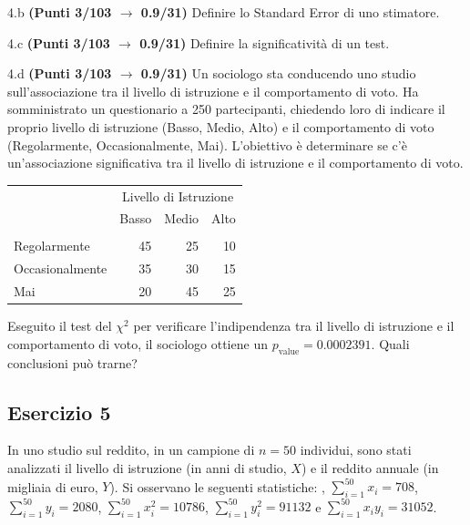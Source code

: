\documentclass[
  11pt,
]{book}
\theoremstyle{mytheoremstyle}
\theoremstyle{mydefstyle}
\begin{document}
4.b \textbf{(Punti 3/103 \(\rightarrow\) 0.9/31)} Definire lo Standard Error di uno stimatore.

4.c \textbf{(Punti 3/103 \(\rightarrow\) 0.9/31)} Definire la significatività di un test.

4.d \textbf{(Punti 3/103 \(\rightarrow\) 0.9/31)} Un sociologo sta conducendo uno studio sull'associazione tra il livello di istruzione e il comportamento di voto. Ha somministrato un questionario a 250 partecipanti, chiedendo loro di indicare il proprio livello di istruzione (Basso, Medio, Alto) e il comportamento di voto (Regolarmente, Occasionalmente, Mai). L'obiettivo è determinare se c'è un'associazione significativa tra il livello di istruzione e il comportamento di voto.

\begin{table}[H]
\centering\centering\centering
\begin{tabular}{lrrr}
\toprule
\multicolumn{1}{c}{ } & \multicolumn{3}{c}{Livello di Istruzione} \\
\cmidrule(l{3pt}r{3pt}){2-4}
  & Basso & Medio & Alto\\
\midrule
\addlinespace[0.3em]
\multicolumn{4}{l}{\textbf{Comportamento di Voto}}\\
\hspace{1em}Regolarmente & 45 & 25 & 10\\
\hspace{1em}Occasionalmente & 35 & 30 & 15\\
\hspace{1em}Mai & 20 & 45 & 25\\
\bottomrule
\end{tabular}
\end{table}

Eseguito il test del \(\chi^2\) per verificare l'indipendenza tra il livello di istruzione e il comportamento di voto, il sociologo ottiene un \(p_\text{value}=0.0002391\). Quali conclusioni può trarne?

\subsection{Esercizio 5}\label{esercizio-5-32}

In uno studio sul reddito, in un campione di \(n=50\) individui, sono stati analizzati il livello di istruzione (in anni di studio, \(X\)) e il reddito annuale (in migliaia di euro, \(Y\)).
Si osservano le seguenti statistiche:
, \(\sum_{i=1}^{50}x_i=708\), \(\sum_{i=1}^{50}y_i=2080\),
\(\sum_{i=1}^{50}x_i^2=10786\), \(\sum_{i=1}^{50}y_i^2=91132\) e \(\sum_{i=1}^{50}x_iy_i=31052\).
\end{document}
